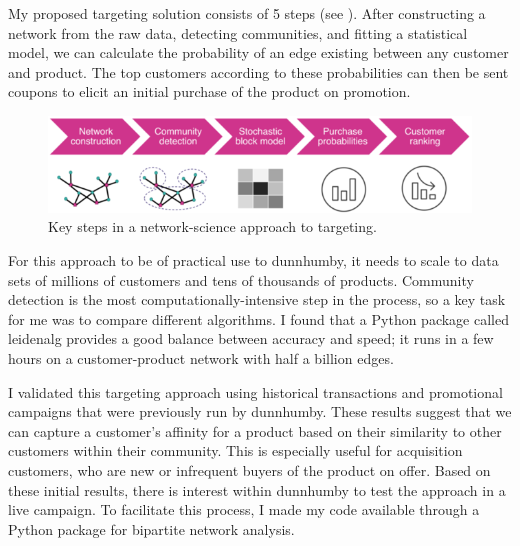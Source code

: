 \documentclass[a4paper, 10pt, english, oneside]{extarticle}
\begin{document}
My proposed targeting solution consists of 5 steps (see ). After
constructing a network from the raw data, detecting communities, and fitting a statistical model,
we can calculate the probability of an edge existing between any customer and product. The top
customers according to these probabilities can then be sent coupons to elicit an initial purchase
of the product on promotion.

\begin{figure}[h!tb]
\centering
\includegraphics[width=0.7\linewidth]{flow_chart}
\caption{Key steps in a network-science approach to targeting.}
\label{flow_chart}
\end{figure}

For this approach to be of practical use to dunnhumby, it needs to scale to data sets of millions of customers and tens of thousands of products. Community detection is the most computationally-intensive step in the process, so a key task for me was to compare different algorithms. I found that a Python package called leidenalg provides a good balance between accuracy and speed; it runs in a few hours on a customer-product network with half a billion edges.

I validated this targeting approach using historical transactions and promotional campaigns that were previously run by dunnhumby. These results suggest that we can capture a customer's affinity for a product based on their similarity to other customers within their community. This is especially useful for acquisition customers, who are new or infrequent buyers of the product on offer. Based on these initial results, there is interest within dunnhumby to test the approach in a live campaign. To facilitate this process, I made my code available through a Python package for bipartite network analysis.
\end{document}
